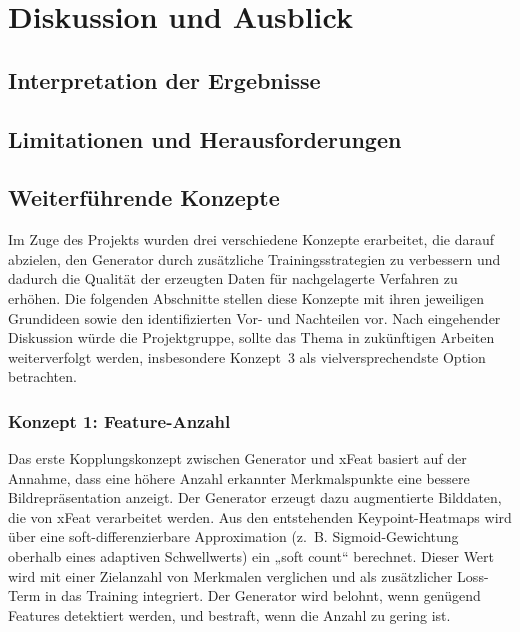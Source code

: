 \chapter{Diskussion und Ausblick}
\label{ch:DiskussionAusblick}


\section{Interpretation der Ergebnisse}
\label{sec:InterpretationErgebnisse}


\section{Limitationen und Herausforderungen}
\label{sec:LimitationenHerausforderungen}


\section{Weiterführende Konzepte}
\label{sec:Konzepte}
Im Zuge des Projekts wurden drei verschiedene Konzepte erarbeitet, die darauf abzielen, den Generator durch 
zusätzliche Trainingsstrategien zu verbessern und dadurch die Qualität der erzeugten Daten für nachgelagerte 
Verfahren zu erhöhen. Die folgenden Abschnitte stellen diese Konzepte mit ihren jeweiligen Grundideen sowie den 
identifizierten Vor- und Nachteilen vor. Nach eingehender Diskussion würde die Projektgruppe, sollte das Thema in 
zukünftigen Arbeiten weiterverfolgt werden, insbesondere Konzept~3 als vielversprechendste Option betrachten.

\subsection{Konzept 1: Feature-Anzahl}
\label{sec:Konzept1}
Das erste Kopplungskonzept zwischen Generator und \ac{xFeat} basiert auf der Annahme, dass eine höhere Anzahl erkannter Merkmalspunkte eine bessere Bildrepräsentation anzeigt. 
Der Generator erzeugt dazu augmentierte Bilddaten, die von \ac{xFeat} verarbeitet werden. 
Aus den entstehenden Keypoint-Heatmaps wird über eine soft-differenzierbare Approximation (z.~B. Sigmoid-Gewichtung oberhalb eines adaptiven Schwellwerts) ein „soft count“ berechnet. 
Dieser Wert wird mit einer Zielanzahl von Merkmalen verglichen und als zusätzlicher Loss-Term in das Training integriert. 
Der Generator wird belohnt, wenn genügend Features detektiert werden, und bestraft, wenn die Anzahl zu gering ist.  


